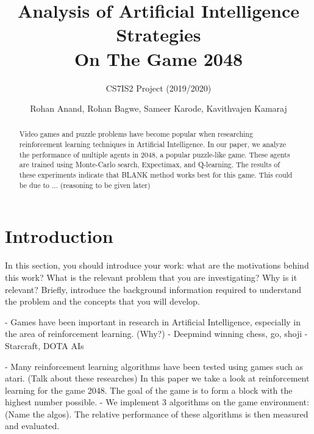 \documentclass{svproc}
\begin{document}
    \mainmatter
    \title{Analysis of Artificial Intelligence Strategies\\On The Game 2048
    }
    \subtitle{CS7IS2 Project (2019/2020)}
    \author{Rohan Anand, Rohan Bagwe, Sameer Karode, Kavithvajen Kamaraj}


    \maketitle

    \begin{abstract}
        Video games and puzzle problems have become popular when researching reinforcement learning techniques in Artificial Intelligence. In our paper, we analyze the performance of multiple agents in 2048, a popular puzzle-like game. These agents are trained using Monte-Carlo search, Expectimax, and Q-learning. The results of these experiments indicate that BLANK method works best for this game. This could be due to ... (reasoning to be given later)
    \end{abstract}

    \section{Introduction}
    In this section, you should introduce your work: what are the motivations behind this work? What is the relevant problem that you are investigating? Why is it relevant?
    Briefly, introduce the background information required to understand the problem and the concepts that you will develop.

    - Games have been important in research in Artificial Intelligence, especially in the area of reinforcement learning. (Why?)
    - Deepmind winning chess, go, shoji
    - Starcraft, DOTA AIs

    - Many reinforcement learning algorithms have been tested using games such as atari. (Talk about these researches)
    In this paper we take a look at reinforcement learning for the game 2048. The goal of the game is to form a block with the highest number possible.
    - We implement 3 algorithms on the game environment: (Name the algos). The relative performance of these algorithms is then measured and evaluated.
\end{document}
